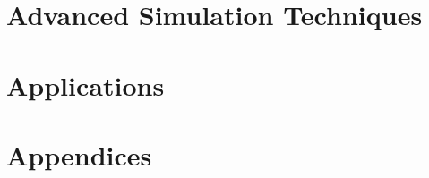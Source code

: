 \documentclass[fleqn,10pt,a4paper,openright]{book}
\begin{document}
\part{Advanced Simulation Techniques}





\part{Applications}




\part{Appendices}
\appendix




 











\printindex

\pagestyle{empty}


\cleardoublepage

\end{document}
